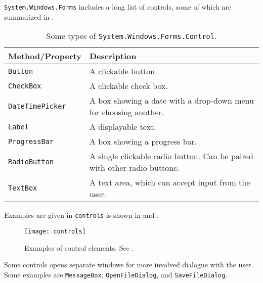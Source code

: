 \lstinline{System.Windows.Forms} includes a long list of controls, some of which are summarized in .
\begin{table}
  \begin{center}
    \begin{tabularx}{\linewidth}{|l|X|}
      \hline
      \rowcolor{headerRowColor}  Method/Property & Description\\
      \hline
      \lstinline{Button}
      &A clickable button.\\
      \hline
      \lstinline{CheckBox}
      &A clickable check box.\\
      \hline
      \lstinline{DateTimePicker}
      &A box showing a date with a drop-down menu for choosing another.\\
      \hline
      \lstinline{Label}
      &A displayable text.\\
      \hline
      \lstinline{ProgressBar}
      &A box showing a progress bar.\\
      \hline
      \lstinline{RadioButton}
      &A single clickable radio button. Can be paired with other radio buttons.\\
      \hline
      \lstinline{TextBox}
      &A text area, which can accept input from the user.\\
      \hline
    \end{tabularx}
  \end{center}
  \caption{Some types of \lstinline{System.Windows.Forms.Control}.}
  \label{tab:controls}
\end{table}
Examples are given in \lstinline{controls} is shown in  and .
%
%
\begin{figure}
  \centering
  \texttt{[image: controls]}
  \caption{Examples of control elements. See .}
  \label{fig:controls}
\end{figure}

Some controls opens separate windows for more involved dialogue with the user. Some examples are \lstinline{MessageBox}, \lstinline{OpenFileDialog}, and \lstinline{SaveFileDialog}.

